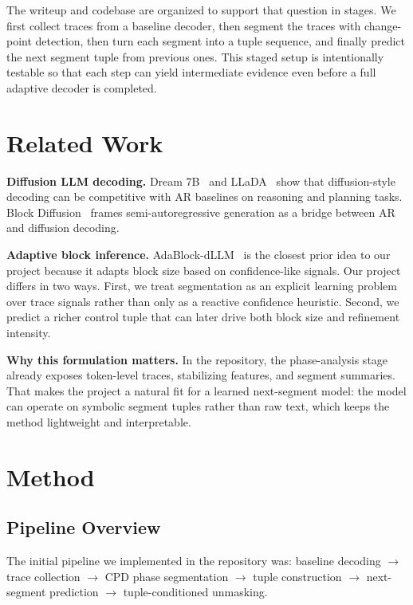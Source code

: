 \documentclass[11pt]{article}
\begin{document}
The writeup and codebase are organized to support that question in stages. We first collect traces from a baseline decoder, then segment the traces with change-point detection, then turn each segment into a tuple sequence, and finally predict the next segment tuple from previous ones. This staged setup is intentionally testable so that each step can yield intermediate evidence even before a full adaptive decoder is completed.

\section{Related Work}

\textbf{Diffusion LLM decoding.} Dream 7B~\citep{ye2025dream} and LLaDA~\citep{nie2025llada} show that diffusion-style decoding can be competitive with AR baselines on reasoning and planning tasks. Block Diffusion~\citep{arriola2025block} frames semi-autoregressive generation as a bridge between AR and diffusion decoding.

\textbf{Adaptive block inference.} AdaBlock-dLLM~\citep{lu2025adablock} is the closest prior idea to our project because it adapts block size based on confidence-like signals. Our project differs in two ways. First, we treat segmentation as an explicit learning problem over trace signals rather than only as a reactive confidence heuristic. Second, we predict a richer control tuple that can later drive both block size and refinement intensity.

\textbf{Why this formulation matters.} In the repository, the phase-analysis stage already exposes token-level traces, stabilizing features, and segment summaries. That makes the project a natural fit for a learned next-segment model: the model can operate on symbolic segment tuples rather than raw text, which keeps the method lightweight and interpretable.

\section{Method}

\subsection{Pipeline Overview}

The initial pipeline we implemented in the repository was:
baseline decoding $\rightarrow$ trace collection $\rightarrow$ CPD phase segmentation $\rightarrow$ tuple construction $\rightarrow$ next-segment prediction $\rightarrow$ tuple-conditioned unmasking.
\end{document}
